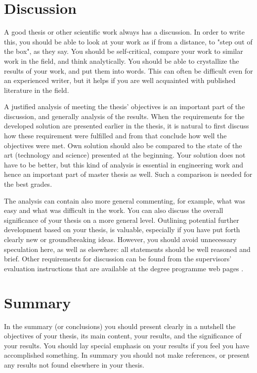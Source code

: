 \section{Discussion}

A good thesis or other scientific work always has a discussion. In order to write this, you should be able to look at your work as if from a distance, to "step out of the box", as they say. You should be self-critical, compare your work to similar work in the field, and think analytically. You should be able to crystallize the results of your work, and put them into words. This can often be difficult even for an experienced writer, but it helps if you are well acquainted with published literature in the field.

A justified analysis of meeting the thesis’ objectives is an important part of the discussion, and generally analysis of the results. When the requirements for the developed solution are presented earlier in the thesis, it is natural to first discuss how these requirement were fulfilled and from that conclude how well the objectives were met. Own solution should also be compared to the state of the art (technology and science) presented at the beginning. Your solution does not have to be better, but this kind of analysis is essential in engineering work and hence an important part of master thesis as well. Such a comparison is needed for the best grades.

The analysis can contain also more general commenting, for example, what was easy and what was difficult in the work. You can also discuss the overall significance of your thesis on a more general level. Outlining potential further development based on your thesis, is valuable, especially if you have put forth clearly new or groundbreaking ideas. However, you should avoid unnecessary speculation here, as well as elsewhere: all statements should be well reasoned and brief. Other requirements for discussion can be found from the supervisors’ evaluation instructions that are available at the degree programme web pages \cite{mscstudies}.

\section{Summary}

In the summary (or conclusions) you should present clearly in a nutshell the objectives of your thesis, its main content, your results, and the significance of your results. You should lay special emphasis on your results if you feel you have accomplished something. In summary you should not make references, or present any results not found elsewhere in your thesis.

